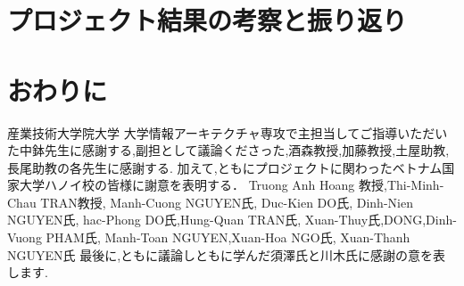 \documentclass[paper]{jrsj}
\begin{document}
\section{プロジェクト結果の考察と振り返り}
\section{おわりに}

\begin{acknowledgements}
産業技術大学院大学 大学情報アーキテクチャ専攻で主担当してご指導いただいた中鉢先生に感謝する,副担として議論くださった,酒森教授,加藤教授,土屋助教,長尾助教の各先生に感謝する.
加えて,ともにプロジェクトに関わったベトナム国家大学ハノイ校の皆様に謝意を表明する．
Truong Anh Hoang 教授,Thi-Minh-Chau TRAN教授, Manh-Cuong NGUYEN氏, Duc-Kien DO氏, Dinh-Nien NGUYEN氏, hac-Phong DO氏,Hung-Quan TRAN氏, Xuan-Thuy氏,DONG,Dinh-Vuong PHAM氏, Manh-Toan NGUYEN,Xuan-Hoa NGO氏, Xuan-Thanh NGUYEN氏
最後に,ともに議論しともに学んだ須澤氏と川木氏に感謝の意を表します.
\cite{takeuchi1986new}
\end{acknowledgements}





\begin{biography}
\end{biography}
\end{document}
